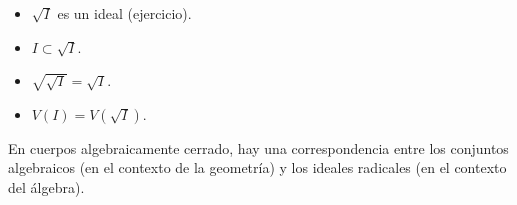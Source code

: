 \documentclass[ACGA.tex]{subfiles}
\begin{document}
\begin{propi}\mbox{}
\begin{itemize}
	\item $\sqrt{I}$ es un ideal (ejercicio).
	\item $I \subset \sqrt{I}$.
	\item $\sqrt{\sqrt{I}} = \sqrt{I}$.
	\item $V(I) = V(\sqrt{I})$.
\end{itemize}
\end{propi}

\begin{nota}
En cuerpos algebraicamente cerrado, hay una correspondencia entre los conjuntos algebraicos (en el contexto de la geometría) y los ideales radicales (en el contexto del álgebra).
\end{nota}
\end{document}
